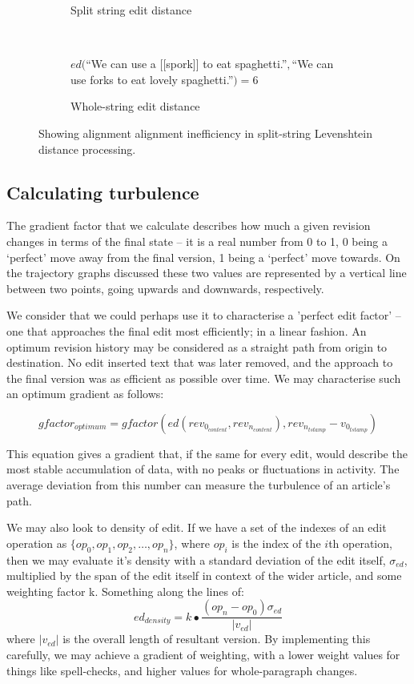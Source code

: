 \begin{figure}[p]
\begin{subfigure}[t]{\linewidth}
\begin{tikzpicture}
    \end{tikzpicture}
    \caption{Split string edit distance}
  \end{subfigure}\\
  \vspace{30mm}
  \begin{subfigure}[t]{\linewidth}
    $ed($``We can use a [[spork]] to eat spaghetti.''$,$``We can use forks
    to eat lovely spaghetti.''$) = 6$
    \caption{Whole-string edit distance}
  \end{subfigure}
  \caption{Showing alignment alignment inefficiency in split-string
    Levenshtein distance processing.}
\label{fig:split-string-problem}
\end{figure}

\subsection*{Calculating turbulence}
The gradient factor that we calculate describes how much a given
revision changes in terms of the final state -- it is a real number
from 0 to 1, 0 being a `perfect' move away from the final version, 1
being a `perfect' move towards. On the trajectory graphs discussed
these two values are represented by a vertical line between two
points, going upwards and downwards, respectively.

We consider that we could perhaps use it to characterise a 'perfect
edit factor' -- one that approaches the final edit most efficiently; in a
linear fashion. An optimum revision history may be considered as a
straight path from origin to destination. No edit inserted text that
was later removed, and the approach to the final version was as
efficient as possible over time. We may characterise such an optimum
gradient as follows:

\[
  gfactor_{optimum} = gfactor(ed(rev_{0_{content}},
  rev_{n_{content}}), rev_{n_{tstamp}} - v_{0_{tstamp}})
\]

This equation gives a gradient that, if the same for every edit, would
describe the most stable accumulation of data, with no peaks or
fluctuations in activity. The average deviation from this number can
measure the turbulence of an article's path. 

We may also look to density of edit. If we have a set of the indexes
of an edit operation as $\{op_0,op_1,op_2,\dots, op_n\}$, where $op_i$
is the index of the $i$th operation, then we may evaluate it's density
with a standard deviation of the edit itself, $\sigma_{ed}$,
multiplied by the span of the edit itself in context of the wider
article, and some weighting factor k. Something along the lines of:
$$ed_{density} = k\bullet\frac{(op_n - op_0)\sigma_{ed}}{|v_{ed}|}$$
where $|v_{ed}|$ is the overall length of resultant version. By
implementing this carefully, we may achieve a gradient of weighting,
with a lower weight values for things like spell-checks, and higher
values for whole-paragraph changes.

